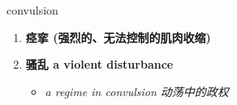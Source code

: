 
\begin{frame}
{\huge convulsion}
\begin{center}
\begin{enumerate}\Large
  \item \textbf{痉挛 (强烈的、无法控制的肌肉收缩)}
  \item \textbf{骚乱 a violent disturbance}
  \begin{itemize}
    \item \em{\Large{a regime in convulsion 动荡中的政权}}
  \end{itemize}
\end{enumerate}
\end{center}
\end{frame}
